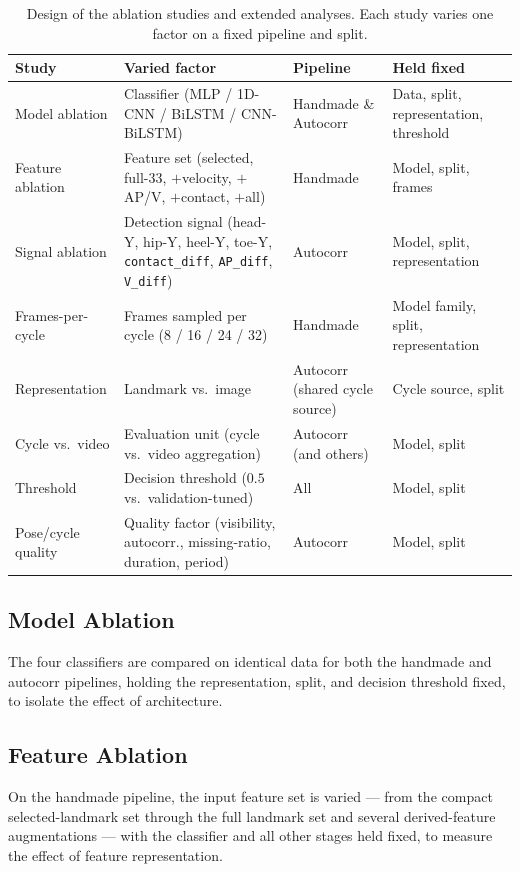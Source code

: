 \begin{table}[htbp]
\centering
\caption{Design of the ablation studies and extended analyses. Each study varies
one factor on a fixed pipeline and split.}
\label{tab:ablations}
\renewcommand{\arraystretch}{1.3}
\footnotesize
\begin{tabularx}{\textwidth}{l X l X}
\toprule
Study & Varied factor & Pipeline & Held fixed \\
\midrule
Model ablation & Classifier (MLP / 1D-CNN / BiLSTM / CNN-BiLSTM) & Handmade \& Autocorr & Data, split, representation, threshold \\
Feature ablation & Feature set (selected, full-33, $+$velocity, $+$AP/V, $+$contact, $+$all) & Handmade & Model, split, frames \\
Signal ablation & Detection signal (head-Y, hip-Y, heel-Y, toe-Y, \texttt{contact\_diff}, \texttt{AP\_diff}, \texttt{V\_diff}) & Autocorr & Model, split, representation \\
Frames-per-cycle & Frames sampled per cycle (8 / 16 / 24 / 32) & Handmade & Model family, split, representation \\
Representation & Landmark vs.\ image & Autocorr (shared cycle source) & Cycle source, split \\
Cycle vs.\ video & Evaluation unit (cycle vs.\ video aggregation) & Autocorr (and others) & Model, split \\
Threshold & Decision threshold ($0.5$ vs.\ validation-tuned) & All & Model, split \\
Pose/cycle quality & Quality factor (visibility, autocorr., missing-ratio, duration, period) & Autocorr & Model, split \\
\bottomrule
\end{tabularx}
\end{table}

\subsection{Model Ablation}
\label{sec:abl-model}
The four classifiers are compared on identical data for both the handmade and
autocorr pipelines, holding the representation, split, and decision threshold
fixed, to isolate the effect of architecture.

\subsection{Feature Ablation}
\label{sec:abl-feature}
On the handmade pipeline, the input feature set is varied --- from the compact
selected-landmark set through the full landmark set and several
derived-feature augmentations --- with the classifier and all other stages held
fixed, to measure the effect of feature representation.

